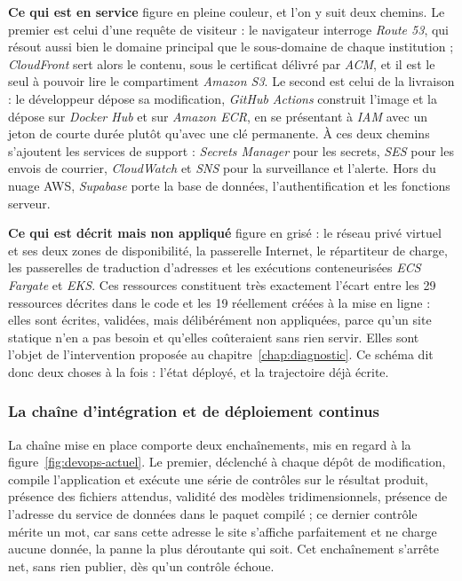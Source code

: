 \textbf{Ce qui est en service} figure en pleine couleur, et l'on y suit deux
chemins. Le premier est celui d'une requête de visiteur : le navigateur
interroge \emph{Route 53}, qui résout aussi bien le domaine principal que le
sous-domaine de chaque institution ; \emph{CloudFront} sert alors le contenu,
sous le certificat délivré par \emph{ACM}, et il est le seul à pouvoir lire le
compartiment \emph{Amazon S3}. Le second est celui de la livraison : le
développeur dépose sa modification, \emph{GitHub Actions} construit l'image et
la dépose sur \emph{Docker Hub} et sur \emph{Amazon ECR}, en se présentant à
\emph{IAM} avec un jeton de courte durée plutôt qu'avec une clé permanente. À
ces deux chemins s'ajoutent les services de support : \emph{Secrets Manager}
pour les secrets, \emph{SES} pour les envois de courrier, \emph{CloudWatch} et
\emph{SNS} pour la surveillance et l'alerte. Hors du nuage AWS, \emph{Supabase}
porte la base de données, l'authentification et les fonctions serveur.

\textbf{Ce qui est décrit mais non appliqué} figure en grisé : le réseau privé
virtuel et ses deux zones de disponibilité, la passerelle Internet, le
répartiteur de charge, les passerelles de traduction d'adresses et les
exécutions conteneurisées \emph{ECS Fargate} et \emph{EKS}. Ces ressources
constituent très exactement l'écart entre les 29 ressources décrites dans le
code et les 19 réellement créées à la mise en ligne : elles sont écrites,
validées, mais délibérément non appliquées, parce qu'un site statique n'en a pas
besoin et qu'elles coûteraient sans rien servir. Elles sont l'objet de
l'intervention proposée au chapitre~\ref{chap:diagnostic}. Ce schéma dit donc
deux choses à la fois : l'état déployé, et la trajectoire déjà écrite.


\subsubsection{La chaîne d'intégration et de déploiement continus}

La chaîne mise en place comporte deux enchaînements, mis en regard à la
figure~\ref{fig:devops-actuel}. Le premier, déclenché à
chaque dépôt de modification, compile l'application et exécute une série de
contrôles sur le résultat produit, présence des fichiers attendus, validité des
modèles tridimensionnels, présence de l'adresse du service de données dans le
paquet compilé ; ce dernier contrôle mérite un mot, car sans cette adresse le
site s'affiche parfaitement et ne charge aucune donnée, la panne la plus
déroutante qui soit. Cet enchaînement s'arrête net, sans rien publier, dès qu'un
contrôle échoue.

